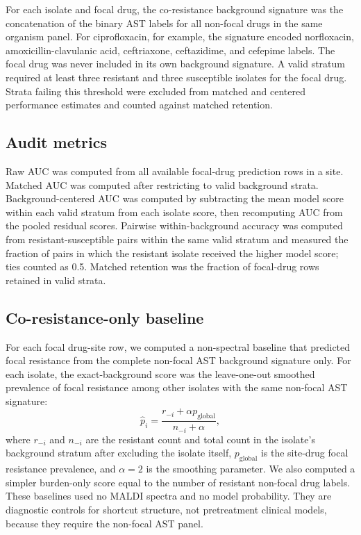 \documentclass[11pt]{article}
\begin{document}
For each isolate and focal drug, the co-resistance background signature was the concatenation of the binary AST labels for all non-focal drugs in the same organism panel. For ciprofloxacin, for example, the signature encoded norfloxacin, amoxicillin-clavulanic acid, ceftriaxone, ceftazidime, and cefepime labels. The focal drug was never included in its own background signature. A valid stratum required at least three resistant and three susceptible isolates for the focal drug. Strata failing this threshold were excluded from matched and centered performance estimates and counted against matched retention.

\subsection*{Audit metrics}

Raw AUC was computed from all available focal-drug prediction rows in a site. Matched AUC was computed after restricting to valid background strata. Background-centered AUC was computed by subtracting the mean model score within each valid stratum from each isolate score, then recomputing AUC from the pooled residual scores. Pairwise within-background accuracy was computed from resistant-susceptible pairs within the same valid stratum and measured the fraction of pairs in which the resistant isolate received the higher model score; ties counted as 0.5. Matched retention was the fraction of focal-drug rows retained in valid strata.

\subsection*{Co-resistance-only baseline}

For each focal drug-site row, we computed a non-spectral baseline that predicted focal resistance from the complete non-focal AST background signature only. For each isolate, the exact-background score was the leave-one-out smoothed prevalence of focal resistance among other isolates with the same non-focal AST signature:
\[
  \hat{p}_{i} = \frac{r_{-i} + \alpha p_{\mathrm{global}}}{n_{-i} + \alpha},
\]
where $r_{-i}$ and $n_{-i}$ are the resistant count and total count in the isolate's background stratum after excluding the isolate itself, $p_{\mathrm{global}}$ is the site-drug focal resistance prevalence, and $\alpha=2$ is the smoothing parameter. We also computed a simpler burden-only score equal to the number of resistant non-focal drug labels. These baselines used no MALDI spectra and no model probability. They are diagnostic controls for shortcut structure, not pretreatment clinical models, because they require the non-focal AST panel.
\end{document}
